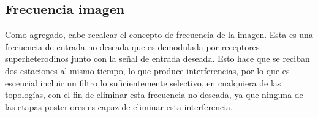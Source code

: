 \documentclass[twocolumn]{article}
\begin{document}
\subsection{Frecuencia imagen}
 Como agregado, cabe recalcar el concepto de frecuencia de la imagen. Esta es una frecuencia de entrada no deseada que es demodulada por receptores superheterodinos junto con la señal de entrada deseada. Esto hace que se reciban dos estaciones al mismo tiempo, lo que produce interferencias, por lo que es escencial incluir un filtro lo suficientemente selectivo, en cualquiera de las topologías, con el fin de eliminar esta frecuencia no deseada, ya que ninguna de las etapas posteriores es capaz de eliminar esta interferencia.
\end{document}
